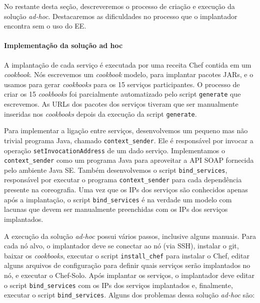 No restante desta seção, descreveremos o processo de criação e execução
da solução \emph{ad-hoc}. Destacaremos as dificuldades no processo
que o implantador encontra sem o uso do EE.

\paragraph{Implementação da solução ad hoc}
A implantação de cada serviço é executada por uma receita Chef contida em um \emph{cookbook}.
Nós escrevemos um \emph{cookbook} modelo, para implantar pacotes JARs,
e o usamos para gerar \emph{cookbooks} para os 15 serviços participantes.
O processo de criar os 15 \emph{cookbooks} foi parcialmente automatizado
pelo script \texttt{generate} que escrevemos.
As URLs dos pacotes dos serviços tiveram que ser manualmente inseridas nos
\emph{cookbooks} depois da execução da script \texttt{generate}.

Para implementar a ligação entre serviços,
desenvolvemos um pequeno mas não trivial programa Java, chamado \texttt{context\_sender}. 
Ele é responsável por invocar a operação \texttt{setInvocationAddress} de um dado serviço.
Implementamos o \texttt{context\_sender} como um programa Java para
aproveitar a API SOAP fornecida pelo ambiente Java SE.
Também desenvolvemos o script \texttt{bind\_services},
responsável por executar o programa \texttt{context\_sender}
para cada dependência presente na coreografia.
Uma vez que os IPs dos serviços são conhecidos apenas após a implantação,
o script \texttt{bind\_services} é na verdade um modelo com lacunas
que devem ser manualmente preenchidas com os IPs dos serviços implantados.

A execução da solução \emph{ad-hoc} possui vários passos,
inclusive alguns manuais.
Para cada nó alvo, o implantador deve se conectar ao nó (via SSH),
instalar o git, baixar os \emph{cookbooks}, executar o script \texttt{install\_chef} 
para instalar o Chef, editar alguns arquivos de configuração para definir
quais serviços serão implantados no nó, e executar o Chef-Solo.
Após implantar os serviços, o implantador deve editar o script
\texttt{bind\_services} com os IPs dos serviços implantados
e, finalmente, executar o script \texttt{bind\_services}.
Alguns dos problemas dessa solução \emph{ad-hoc} são:

